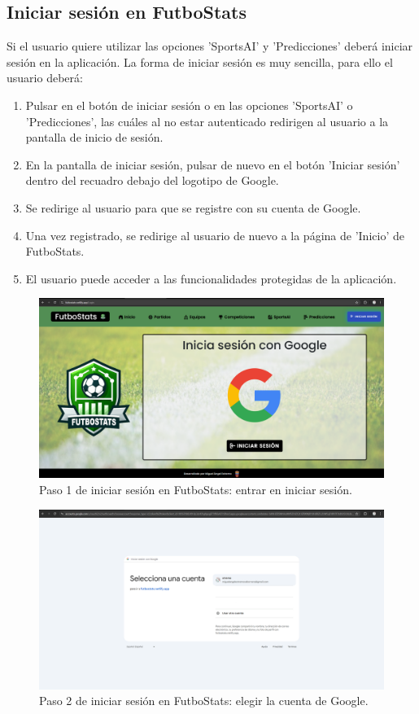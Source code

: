 \subsection{Iniciar sesión en FutboStats}
Si el usuario quiere utilizar las opciones 'SportsAI' y 'Predicciones' deberá iniciar sesión en la aplicación. La forma de iniciar sesión es muy sencilla, para ello el usuario deberá:
\begin{enumerate}
    \item Pulsar en el botón de iniciar sesión o en las opciones 'SportsAI' o 'Predicciones', las cuáles al no estar autenticado redirigen al usuario a la pantalla de inicio de sesión.
    \item En la pantalla de iniciar sesión, pulsar de nuevo en el botón 'Iniciar sesión' dentro del recuadro debajo del logotipo de Google.
    \item Se redirige al usuario para que se registre con su cuenta de Google.
    \item Una vez registrado, se redirige al usuario de nuevo a la página de 'Inicio' de FutboStats.
    \item El usuario puede acceder a las funcionalidades protegidas de la aplicación.
\end{enumerate}

\begin{figure}[H]
    \centering
    \includegraphics[width=1\linewidth]{img/iniciarSesion-UM.png}
    \caption{Paso 1 de iniciar sesión en FutboStats: entrar en iniciar sesión.}
    \label{fig:enter-label}
\end{figure}

\begin{figure}[H]
    \centering
    \includegraphics[width=1\linewidth]{img/iniciarSesion2-UM.png}
    \caption{Paso 2 de iniciar sesión en FutboStats: elegir la cuenta de Google.}
    \label{fig:enter-label}
\end{figure}

